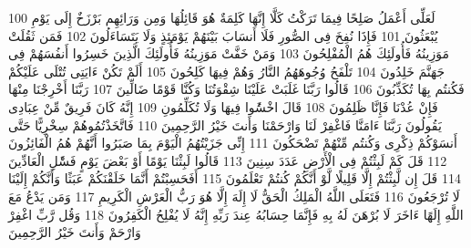 \documentclass[20pt,a4paper]{article}
\begin{document}
{\tiny\colorbox{cl_aya}{100}} لَعَلِّى أَعْمَلُ صَلِحًا فِيمَا تَرَكْتُ كَلَّا إِنَّهَا كَلِمَةٌ هُوَ قَائِلُهَا وَمِن وَرَائِهِم بَرْزَخٌ إِلَى يَوْمِ يُبْعَثُونَ
{\tiny\colorbox{cl_aya}{101}} فَإِذَا نُفِخَ فِى الصُّورِ فَلَا أَنسَابَ بَيْنَهُمْ يَوْمَئِذٍ وَلَا يَتَسَاءَلُونَ
{\tiny\colorbox{cl_aya}{102}} فَمَن ثَقُلَتْ مَوَزِينُهُ فَأُولَئِكَ هُمُ الْمُفْلِحُونَ
{\tiny\colorbox{cl_aya}{103}} وَمَنْ خَفَّتْ مَوَزِينُهُ فَأُولَئِكَ الَّذِينَ خَسِرُوا أَنفُسَهُمْ فِى جَهَنَّمَ خَلِدُونَ
{\tiny\colorbox{cl_aya}{104}} تَلْفَحُ وُجُوهَهُمُ النَّارُ وَهُمْ فِيهَا كَلِحُونَ
{\tiny\colorbox{cl_aya}{105}} أَلَمْ تَكُنْ ءَايَتِى تُتْلَى عَلَيْكُمْ فَكُنتُم بِهَا تُكَذِّبُونَ
{\tiny\colorbox{cl_aya}{106}} قَالُوا رَبَّنَا غَلَبَتْ عَلَيْنَا شِقْوَتُنَا وَكُنَّا قَوْمًا ضَالِّينَ
{\tiny\colorbox{cl_aya}{107}} رَبَّنَا أَخْرِجْنَا مِنْهَا فَإِنْ عُدْنَا فَإِنَّا ظَلِمُونَ
{\tiny\colorbox{cl_aya}{108}} قَالَ اخْسَُٔوا فِيهَا وَلَا تُكَلِّمُونِ
{\tiny\colorbox{cl_aya}{109}} إِنَّهُ كَانَ فَرِيقٌ مِّنْ عِبَادِى يَقُولُونَ رَبَّنَا ءَامَنَّا فَاغْفِرْ لَنَا وَارْحَمْنَا وَأَنتَ خَيْرُ الرَّحِمِينَ
{\tiny\colorbox{cl_aya}{110}} فَاتَّخَذْتُمُوهُمْ سِخْرِيًّا حَتَّى أَنسَوْكُمْ ذِكْرِى وَكُنتُم مِّنْهُمْ تَضْحَكُونَ
{\tiny\colorbox{cl_aya}{111}} إِنِّى جَزَيْتُهُمُ الْيَوْمَ بِمَا صَبَرُوا أَنَّهُمْ هُمُ الْفَائِزُونَ
{\tiny\colorbox{cl_aya}{112}} قَلَ كَمْ لَبِثْتُمْ فِى الْأَرْضِ عَدَدَ سِنِينَ
{\tiny\colorbox{cl_aya}{113}} قَالُوا لَبِثْنَا يَوْمًا أَوْ بَعْضَ يَوْمٍ فَسَْٔلِ الْعَادِّينَ
{\tiny\colorbox{cl_aya}{114}} قَلَ إِن لَّبِثْتُمْ إِلَّا قَلِيلًا لَّوْ أَنَّكُمْ كُنتُمْ تَعْلَمُونَ
{\tiny\colorbox{cl_aya}{115}} أَفَحَسِبْتُمْ أَنَّمَا خَلَقْنَكُمْ عَبَثًا وَأَنَّكُمْ إِلَيْنَا لَا تُرْجَعُونَ
{\tiny\colorbox{cl_aya}{116}} فَتَعَلَى اللَّهُ الْمَلِكُ الْحَقُّ لَا إِلَهَ إِلَّا هُوَ رَبُّ الْعَرْشِ الْكَرِيمِ
{\tiny\colorbox{cl_aya}{117}} وَمَن يَدْعُ مَعَ اللَّهِ إِلَهًا ءَاخَرَ لَا بُرْهَنَ لَهُ بِهِ فَإِنَّمَا حِسَابُهُ عِندَ رَبِّهِ إِنَّهُ لَا يُفْلِحُ الْكَفِرُونَ
{\tiny\colorbox{cl_aya}{118}} وَقُل رَّبِّ اغْفِرْ وَارْحَمْ وَأَنتَ خَيْرُ الرَّحِمِينَ
\end{document}
